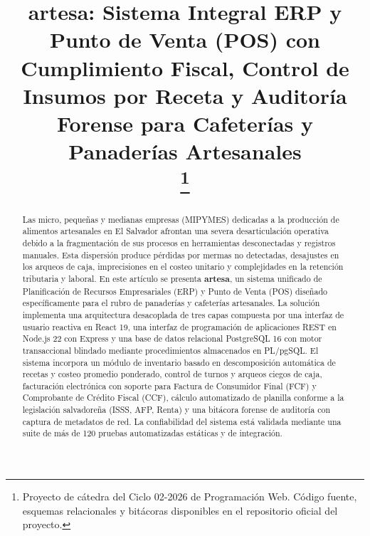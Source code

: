 \documentclass[conference]{IEEEtran}
\begin{document}
\title{artesa: Sistema Integral ERP y Punto de Venta (POS) con Cumplimiento Fiscal, Control de Insumos por Receta y Auditoría Forense para Cafeterías y Panaderías Artesanales\\
\thanks{Proyecto de cátedra del Ciclo 02-2026 de Programación Web. Código fuente, esquemas relacionales y bitácoras disponibles en el repositorio oficial del proyecto.}
}

\author{
}

\maketitle

\begin{abstract}
Las micro, pequeñas y medianas empresas (MIPYMES) dedicadas a la producción de alimentos artesanales en El Salvador afrontan una severa desarticulación operativa debido a la fragmentación de sus procesos en herramientas desconectadas y registros manuales. Esta dispersión produce pérdidas por mermas no detectadas, desajustes en los arqueos de caja, imprecisiones en el costeo unitario y complejidades en la retención tributaria y laboral. En este artículo se presenta \textbf{artesa}, un sistema unificado de Planificación de Recursos Empresariales (ERP) y Punto de Venta (POS) diseñado específicamente para el rubro de panaderías y cafeterías artesanales. La solución implementa una arquitectura desacoplada de tres capas compuesta por una interfaz de usuario reactiva en React 19, una interfaz de programación de aplicaciones REST en Node.js 22 con Express y una base de datos relacional PostgreSQL 16 con motor transaccional blindado mediante procedimientos almacenados en PL/pgSQL. El sistema incorpora un módulo de inventario basado en descomposición automática de recetas y costeo promedio ponderado, control de turnos y arqueos ciegos de caja, facturación electrónica con soporte para Factura de Consumidor Final (FCF) y Comprobante de Crédito Fiscal (CCF), cálculo automatizado de planilla conforme a la legislación salvadoreña (ISSS, AFP, Renta) y una bitácora forense de auditoría con captura de metadatos de red. La confiabilidad del sistema está validada mediante una suite de más de 120 pruebas automatizadas estáticas y de integración.
\end{abstract}
\end{document}
